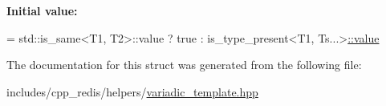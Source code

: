 {\bfseries Initial value\+:}
\begin{DoxyCode}
= std::is\_same<T1, T2>::value
                                  ? true
                                  : is\_type\_present<T1, Ts...>\hyperlink{structcpp__redis_1_1helpers_1_1is__type__present_a7b5e8d970ba974a9b58cbc440983c25c}{::value}
\end{DoxyCode}


The documentation for this struct was generated from the following file\+:\begin{DoxyCompactItemize}
\item 
includes/cpp\+\_\+redis/helpers/\hyperlink{variadic__template_8hpp}{variadic\+\_\+template.\+hpp}\end{DoxyCompactItemize}
